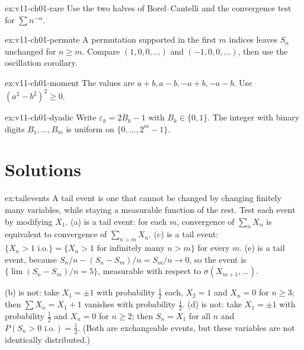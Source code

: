 \begin{hint}{ex:v11-ch01-rare}
Use the two halves of Borel--Cantelli and the convergence test for $\sum n^{-\alpha}$.
\end{hint}
\begin{hint}{ex:v11-ch01-permute}
A permutation supported in the first $m$ indices leaves $S_n$ unchanged for $n\ge m$. Compare $(1,0,0,\ldots)$ and $(-1,0,0,\ldots)$, then use the oscillation corollary.
\end{hint}
\begin{hint}{ex:v11-ch01-moment}
The values are $a+b,a-b,-a+b,-a-b$. Use $(a^2-b^2)^2\ge0$.
\end{hint}
\begin{hint}{ex:v11-ch01-dyadic}
Write $\varepsilon_k=2B_k-1$ with $B_k\in\{0,1\}$. The integer with binary digits $B_1,\dots,B_m$ is uniform on $\{0,\dots,2^m-1\}$.
\end{hint}

\section{Solutions}

\begin{solution}{ex:tailevents}
\idea A tail event is one that cannot be changed by changing finitely many variables, while staying a measurable function of the rest.
Test each event by modifying $X_1$.
\writeup (a) is a tail event: for each $m$, convergence of $\sum_nX_n$ is equivalent to convergence of $\sum_{n>m}X_n$. (c) is a tail
event: $\{X_n>1\text{ i.o.}\}=\{X_n>1\text{ for infinitely many }n>m\}$ for every $m$. (e) is a tail event, because $S_n/n-(S_n-S_m)/n=
S_m/n\to0$, so the event is $\{\lim(S_n-S_m)/n=5\}$, measurable with respect to $\sigma(X_{m+1},\dots)$.

(b) is not: take $X_1=\pm1$ with probability $\frac12$ each, $X_2=1$ and $X_n=0$ for $n\ge3$; then $\sum X_n=X_1+1$ vanishes with
probability $\frac12$. (d) is not: take $X_1=\pm1$ with probability $\frac12$ and $X_n=0$ for $n\ge2$; then $S_n=X_1$ for all $n$ and
$P(S_n>0\text{ i.o.})=\frac12$. (Both are exchangeable events, but these variables are not identically distributed.)
\end{solution}

